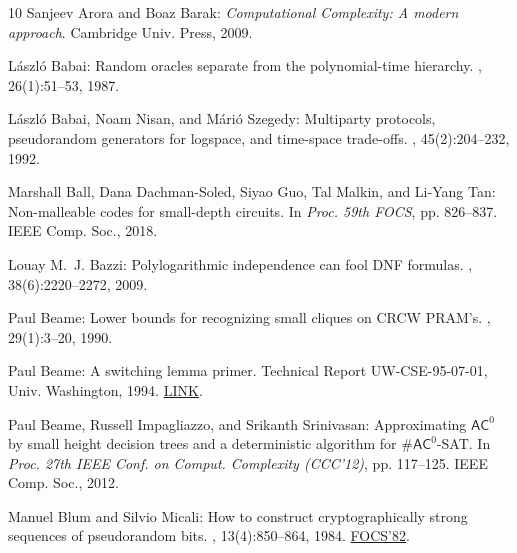 \documentclass[11pt]{article}
\numberwithin{equation}{section}
\theoremstyle{definition}
\theoremstyle{plain}
\theoremstyle{plain}
\begin{document}
\begin{thebibliography}{10}
{\sc Sanjeev Arora and Boaz Barak}: {\em Computational Complexity: {A} modern
  approach}.
\newblock Cambridge Univ. Press, 2009.

{\sc L{\'a}szl{\'o} Babai}: Random oracles separate {{}} from the
  polynomial-time hierarchy.
, 26(1):51--53, 1987.
\newblock [\epfmtdoi{10.1016/0020-0190(87)90036-6}]

{\sc L{\'a}szl{\'o} Babai, Noam Nisan, and M{\'a}ri{\'o} Szegedy}: Multiparty
  protocols, pseudorandom generators for logspace, and time-space trade-offs.
, 45(2):204--232, 1992.
\newblock [\epfmtdoi{10.1016/0022-0000(92)90047-M}]

{\sc Marshall Ball, Dana Dachman{-}Soled, Siyao Guo, Tal Malkin, and Li{-}Yang
  Tan}: Non-malleable codes for small-depth circuits.
\newblock In {\em Proc. 59th FOCS}, pp. 826--837. IEEE Comp. Soc., 2018.

{\sc Louay M.~J. Bazzi}: Polylogarithmic independence can fool {DNF} formulas.
, 38(6):2220--2272, 2009.
\newblock [\epfmtdoi{10.1137/070691954}]

{\sc Paul Beame}: Lower bounds for recognizing small cliques on {CRCW}
  {PRAM's}.
, 29(1):3--20, 1990.
\newblock [\epfmtdoi{10.1016/0166-218X(90)90079-R}]

{\sc Paul Beame}: A switching lemma primer.
\newblock Technical Report UW-CSE-95-07-01, Univ. Washington, 1994.
\newblock
  \href{https://www.cs.toronto.edu/~toni/Courses/Complexity2015/handouts/primer.pdf}{LINK}.

{\sc Paul Beame, Russell Impagliazzo, and Srikanth Srinivasan}: Approximating
  {$\mathsf{AC}^0$} by small height decision trees and a deterministic
  algorithm for {$\#\mathsf{AC}^0$-SAT}.
\newblock In {\em Proc. 27th IEEE Conf. on Comput. Complexity (CCC'12)}, pp.
  117--125. IEEE Comp. Soc., 2012.

{\sc Manuel Blum and Silvio Micali}: How to construct cryptographically strong
  sequences of pseudorandom bits.
, 13(4):850--864, 1984.
\newblock \prelim \href{10.1109/SFCS.1982.72}{FOCS'82}.
\newblock [\epfmtdoi{10.1137/0213053}]


\end{thebibliography}
\end{document}
